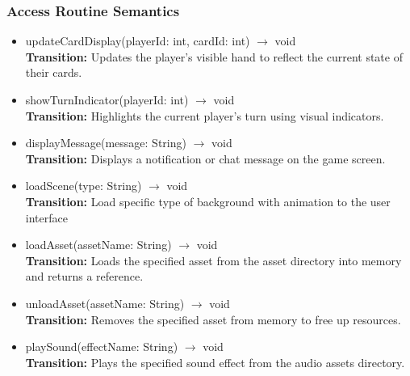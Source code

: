 \documentclass[12pt, titlepage]{article}
\begin{document}
\subsubsection{Access Routine Semantics}

\begin{itemize}
\item updateCardDisplay(playerId: int, cardId: int) $\rightarrow$ void\\
\textbf{Transition:} Updates the player’s visible hand to reflect the current state of their cards.

\item showTurnIndicator(playerId: int) $\rightarrow$ void\\
\textbf{Transition:} Highlights the current player's turn using visual indicators.

\item displayMessage(message: String) $\rightarrow$ void\\
\textbf{Transition:} Displays a notification or chat message on the game screen.

\item loadScene(type: String) $\rightarrow$ void\\
\textbf{Transition:} Load specific type of background with animation to the user interface

\item loadAsset(assetName: String) $\rightarrow$ void\\
\textbf{Transition:} Loads the specified asset from the asset directory into memory and returns a reference.

\item unloadAsset(assetName: String) $\rightarrow$ void\\
\textbf{Transition:} Removes the specified asset from memory to free up resources.

\item playSound(effectName: String) $\rightarrow$ void\\
\textbf{Transition:} Plays the specified sound effect from the audio assets directory.

\end{itemize}
\end{document}

